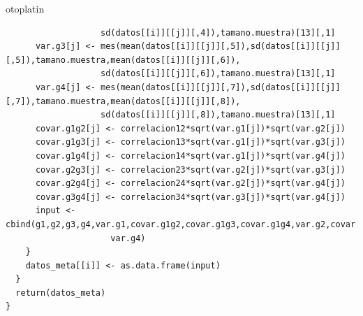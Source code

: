 otoplatin\documentclass[a4paper,openright,12pt]{report}
\begin{document}
{\begin{verbatim}
                   sd(datos[[i]][[j]][,4]),tamano.muestra)[13][,1]
      var.g3[j] <- mes(mean(datos[[i]][[j]][,5]),sd(datos[[i]][[j]][,5]),tamano.muestra,mean(datos[[i]][[j]][,6]),
                   sd(datos[[i]][[j]][,6]),tamano.muestra)[13][,1]
      var.g4[j] <- mes(mean(datos[[i]][[j]][,7]),sd(datos[[i]][[j]][,7]),tamano.muestra,mean(datos[[i]][[j]][,8]),
                   sd(datos[[i]][[j]][,8]),tamano.muestra)[13][,1]
      covar.g1g2[j] <- correlacion12*sqrt(var.g1[j])*sqrt(var.g2[j])
      covar.g1g3[j] <- correlacion13*sqrt(var.g1[j])*sqrt(var.g3[j])
      covar.g1g4[j] <- correlacion14*sqrt(var.g1[j])*sqrt(var.g4[j])
      covar.g2g3[j] <- correlacion23*sqrt(var.g2[j])*sqrt(var.g3[j])
      covar.g2g4[j] <- correlacion24*sqrt(var.g2[j])*sqrt(var.g4[j])
      covar.g3g4[j] <- correlacion34*sqrt(var.g3[j])*sqrt(var.g4[j])
      input <- cbind(g1,g2,g3,g4,var.g1,covar.g1g2,covar.g1g3,covar.g1g4,var.g2,covar.g2g3,covar.g2g4,var.g3,covar.g3g4,
                     var.g4)
    }
    datos_meta[[i]] <- as.data.frame(input)
  }
  return(datos_meta)
}
\end{verbatim}}
\end{document}
